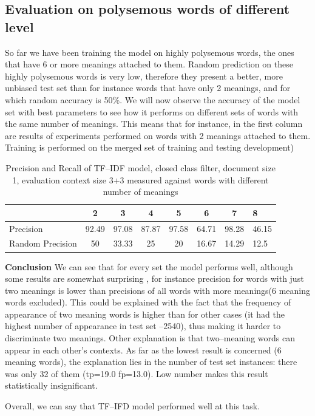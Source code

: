 \subsection{ Evaluation on polysemous words of different level}
So far we have been training the model on highly polysemous words, the ones that have 6 or more 
meanings attached to them. Random prediction on these highly polysemous words is very low, therefore
they present a better, more unbiased test set than for instance words that have only 2 meanings, and 
for which random accuracy is 50\%. We will now observe the accuracy of the model set with best
parameters to see how it performs on different sets of words with the same number of meanings. This means
that for instance, in the first column are results of experiments performed on words with 2 meanings attached to them.
Training is performed on the merged set of training and testing development)

\begin{table}[h!]
\begin{tabular}{ l | c c c c c c   }
     & 2 & 3 & 4 & 5 & 6& 7 & 8  \\
 \hline
Precision  & 92.49 & 97.08 & 87.87 & 97.58 & 64.71 & 98.28 & 46.15\\ 
Random Precision & 50 & 33.33 & 25 & 20 & 16.67 & 14.29 & 12.5 \\
\end{tabular}
\caption{Precision and Recall of TF--IDF model, closed class filter, document size 1, evaluation context size 3+3 measured against words with different number of meanings}
\end{table} 

\textbf{Conclusion}
We can see that for every set the model performs well, although some results are somewhat surprising
, for instance precision for words with just two meanings is lower than precisions of all words with 
more meanings(6 meaning words excluded). This could be explained with the fact that the frequency of appearance 
of two meaning  words is higher than for other cases (it had the highest number of appearance in test
set --2540), thus making it harder to discriminate two meanings. Other explanation is that two--meaning words can appear in each other's contexts. As far as the lowest result is concerned (6 meaning words), the explanation lies in the number of test set instances: there was only 32 of them (tp=19.0 fp=13.0). Low number makes this result statistically insignificant. 

Overall, we can say that TF--IFD model performed well at this task. 

